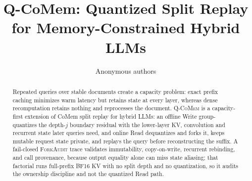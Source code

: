 \documentclass{article}
\title{Q-CoMem: Quantized Split Replay for Memory-Constrained Hybrid LLMs}
\author{Anonymous authors}
\newcommand{\qcomem}{\textsc{Q-CoMem}}
\newcommand{\method}{\textsc{ForkAudit}}
\begin{document}
\raggedbottom
\maketitle

\begin{abstract}
Repeated queries over stable documents create a capacity problem: exact prefix
caching minimizes warm latency but retains state at every layer, whereas dense
recomputation retains nothing and reprocesses the document.  \qcomem{} is a capacity-first extension of CoMem split replay for hybrid LLMs:
an offline Write group-quantizes the depth-$j$ boundary residual with the
lower-layer KV, convolution and recurrent state later queries need, and online
Read dequantizes and forks it, keeps mutable request state private, and
replays the query before reconstructing the suffix.  A fail-closed \method{}
trace validates immutability, copy-on-write, recurrent rebinding, and call
provenance, because output equality alone can miss state aliasing; that
factorial runs full-prefix BF16 KV with no split depth and no quantization, so
it audits the ownership discipline and not the quantized Read path.


\end{abstract}
\end{document}
